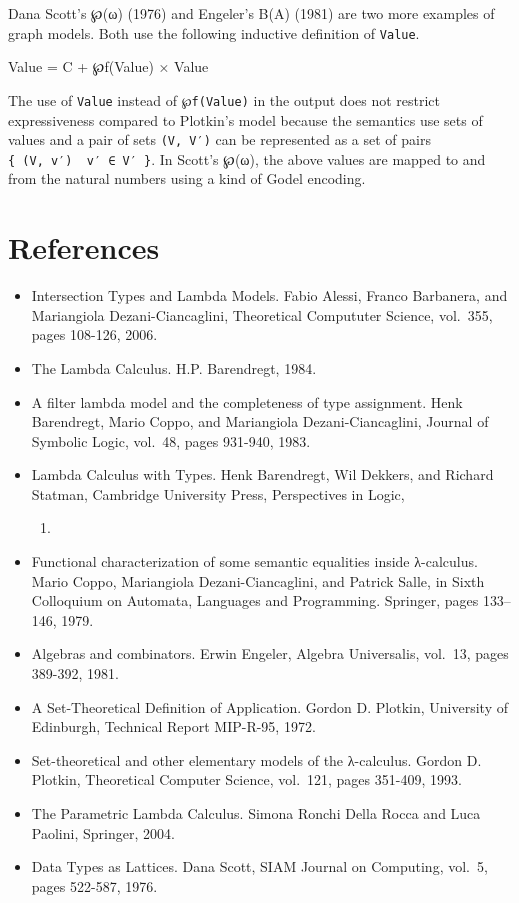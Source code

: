 Dana Scott's ℘(ω) (1976) and Engeler's B(A) (1981) are two more examples
of graph models. Both use the following inductive definition of
\texttt{Value}.

\begin{myDisplay}
Value = C + ℘f(Value) × Value
\end{myDisplay}

The use of \texttt{Value} instead of \texttt{℘f(Value)} in the output
does not restrict expressiveness compared to Plotkin's model because the
semantics use sets of values and a pair of sets \texttt{(V,\ V′)} can be
represented as a set of pairs
\texttt{\{\ (V,\ v′)\ \textbar{}\ v′\ ∈\ V′\ \}}. In Scott's ℘(ω), the
above values are mapped to and from the natural numbers using a kind of
Godel encoding.

\hypertarget{references}{%
\section{References}\label{references}}

\begin{itemize}
\item
  Intersection Types and Lambda Models. Fabio Alessi, Franco Barbanera,
  and Mariangiola Dezani-Ciancaglini, Theoretical Compututer Science,
  vol.~355, pages 108-126, 2006.
\item
  The Lambda Calculus. H.P. Barendregt, 1984.
\item
  A filter lambda model and the completeness of type assignment. Henk
  Barendregt, Mario Coppo, and Mariangiola Dezani-Ciancaglini, Journal
  of Symbolic Logic, vol.~48, pages 931-940, 1983.
\item
  Lambda Calculus with Types. Henk Barendregt, Wil Dekkers, and Richard
  Statman, Cambridge University Press, Perspectives in Logic,

  \begin{enumerate}
  \def\labelenumi{\arabic{enumi}.}
  \setcounter{enumi}{2012}
  \tightlist
  \item
  \end{enumerate}
\item
  Functional characterization of some semantic equalities inside
  λ-calculus. Mario Coppo, Mariangiola Dezani-Ciancaglini, and Patrick
  Salle, in Sixth Colloquium on Automata, Languages and Programming.
  Springer, pages 133--146, 1979.
\item
  Algebras and combinators. Erwin Engeler, Algebra Universalis, vol.~13,
  pages 389-392, 1981.
\item
  A Set-Theoretical Definition of Application. Gordon D. Plotkin,
  University of Edinburgh, Technical Report MIP-R-95, 1972.
\item
  Set-theoretical and other elementary models of the λ-calculus. Gordon
  D. Plotkin, Theoretical Computer Science, vol.~121, pages 351-409,
  1993.
\item
  The Parametric Lambda Calculus. Simona Ronchi Della Rocca and Luca
  Paolini, Springer, 2004.
\item
  Data Types as Lattices. Dana Scott, SIAM Journal on Computing, vol.~5,
  pages 522-587, 1976.
\end{itemize}


